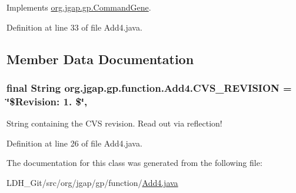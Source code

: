 Implements \hyperlink{classorg_1_1jgap_1_1gp_1_1_command_gene_a236141d99059da808afe7a9217e411c7}{org.\-jgap.\-gp.\-Command\-Gene}.



Definition at line 33 of file Add4.\-java.



\subsection{Member Data Documentation}
\hypertarget{classorg_1_1jgap_1_1gp_1_1function_1_1_add4_a0929e88a1132c13dc1e2b00ae796da1d}{
\subsubsection[{C\-V\-S\-\_\-\-R\-E\-V\-I\-S\-I\-O\-N}]{\setlength{\rightskip}{0pt plus 5cm}final String org.\-jgap.\-gp.\-function.\-Add4.\-C\-V\-S\-\_\-\-R\-E\-V\-I\-S\-I\-O\-N = \char`\"{}\$Revision\-: 1. \$\char`\"{}\hspace{0.3cm}{\ttfamily [static]}, {\ttfamily [private]}}}\label{classorg_1_1jgap_1_1gp_1_1function_1_1_add4_a0929e88a1132c13dc1e2b00ae796da1d}
String containing the C\-V\-S revision. Read out via reflection! 

Definition at line 26 of file Add4.\-java.



The documentation for this class was generated from the following file\-:\begin{DoxyCompactItemize}
\item 
L\-D\-H\-\_\-\-Git/src/org/jgap/gp/function/\hyperlink{_add4_8java}{Add4.\-java}\end{DoxyCompactItemize}
